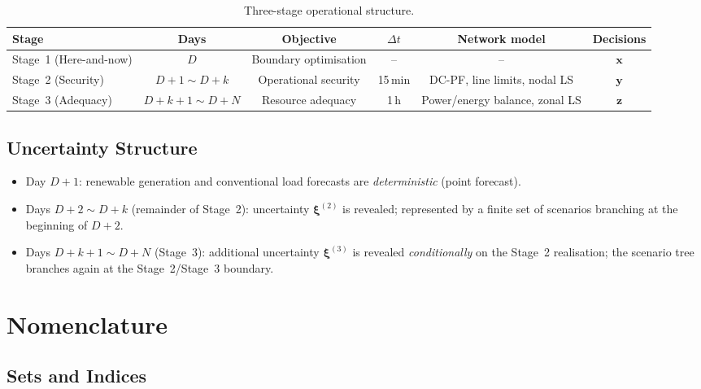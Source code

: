 \documentclass[11pt]{article}
\begin{document}
\begin{table}[H]
\centering
\caption{Three-stage operational structure.}
\label{tab:phases}
\begin{tabular}{lccccc}
\toprule
\textbf{Stage} & \textbf{Days} & \textbf{Objective}
  & \textbf{$\Delta t$} & \textbf{Network model}
  & \textbf{Decisions} \\
\midrule
Stage~1 (Here-and-now) & $D$ & Boundary optimisation
  & -- & -- & $\mathbf{x}$ \\
Stage~2 (Security) & $D{+}1 \sim D{+}k$ & Operational security
  & 15\,min & DC-PF, line limits, nodal LS & $\mathbf{y}$ \\
Stage~3 (Adequacy) & $D{+}k{+}1 \sim D{+}N$ & Resource adequacy
  & 1\,h & Power/energy balance, zonal LS & $\mathbf{z}$ \\
\bottomrule
\end{tabular}
\end{table}

\subsection{Uncertainty Structure}\label{sec:uncertainty-structure}

\begin{itemize}
  \item Day $D{+}1$: renewable generation and conventional load
        forecasts are \emph{deterministic} (point forecast).
  \item Days $D{+}2 \sim D{+}k$ (remainder of Stage~2): uncertainty
        $\boldsymbol{\xi}^{(2)}$ is revealed; represented by a finite
        set of scenarios branching at the beginning of $D{+}2$.
  \item Days $D{+}k{+}1 \sim D{+}N$ (Stage~3): additional uncertainty
        $\boldsymbol{\xi}^{(3)}$ is revealed \emph{conditionally} on the
        Stage~2 realisation; the scenario tree branches again at the
        Stage~2/Stage~3 boundary.
\end{itemize}

\section{Nomenclature}\label{sec:nomenclature}

\subsection{Sets and Indices}
\end{document}
